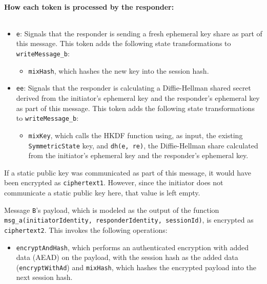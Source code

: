 \paragraph{How each token is processed by the responder:}$ $

\begin{itemize}

\item \texttt{e}: Signals that the responder is sending a fresh ephemeral key share as part of this message. This token adds the following state transformations to \texttt{writeMessage\_b}:
\begin{itemize}

\item \texttt{mixHash}, which hashes the new key into the session hash.
\end{itemize}


\item \texttt{ee}: Signals that the responder is calculating a Diffie-Hellman shared secret derived from the initiator's ephemeral key and the responder's ephemeral key as part of this message. This token adds the following state transformations to \texttt{writeMessage\_b}:
\begin{itemize}

\item \texttt{mixKey}, which calls the HKDF function using, as input, the existing \texttt{SymmetricState} key, and \texttt{dh(e, re)}, the Diffie-Hellman share calculated from the initiator's ephemeral key and the responder's ephemeral key.
\end{itemize}


\end{itemize}
If a static public key was communicated as part of this message, it would have been encrypted as \texttt{ciphertext1}. However, since the initiator does not communicate a static public key here, that value is left empty.


Message \texttt{B}'s payload, which is modeled as the output of the function \texttt{msg\_a(initiatorIdentity, responderIdentity, sessionId)}, is encrypted as \texttt{ciphertext2}. This invokes the following operations:


\begin{itemize}

\item \texttt{encryptAndHash}, which performs an authenticated encryption with added data (AEAD) on the payload, with the session hash as the added data (\texttt{encryptWithAd}) and \texttt{mixHash}, which hashes the encrypted payload into the next session hash.

\end{itemize}
